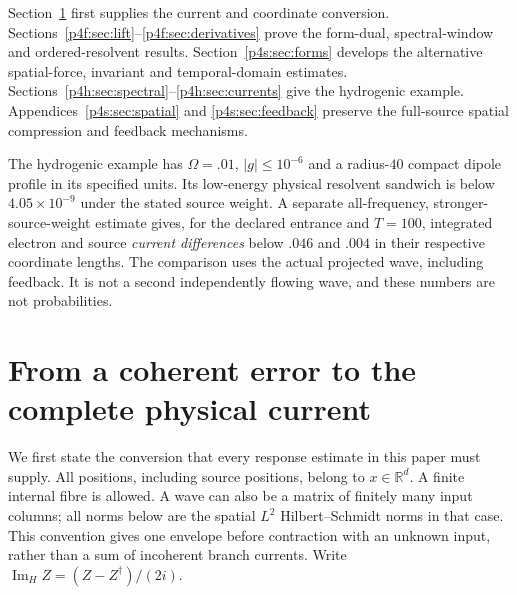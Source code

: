 \documentclass[11pt]{article}
\numberwithin{equation}{section}
\theoremstyle{definition}
\theoremstyle{remark}
\begin{document}
Section~\ref{p4s:sec:current} first supplies the current and coordinate
conversion. Sections~\ref{p4f:sec:lift}--\ref{p4f:sec:derivatives}
prove the form-dual, spectral-window and ordered-resolvent results.
Section~\ref{p4s:sec:forms} develops the alternative spatial-force,
invariant and temporal-domain estimates.
Sections~\ref{p4h:sec:spectral}--\ref{p4h:sec:currents} give the
hydrogenic example. Appendices~\ref{p4s:sec:spatial} and
\ref{p4s:sec:feedback} preserve the full-source spatial compression
and feedback mechanisms.

The hydrogenic example has
$\Omega=.01$, $|g|\leq10^{-6}$ and a radius-$40$ compact dipole
profile in its specified units. Its low-energy physical resolvent
sandwich is below $4.05\times10^{-9}$ under the stated source weight.
A separate all-frequency, stronger-source-weight estimate gives, for
the declared entrance and $T=100$, integrated electron and source
\emph{current differences} below $.046$ and $.004$ in their respective
coordinate lengths. The comparison uses the actual projected wave,
including feedback. It is not a second independently flowing wave,
and these numbers are not probabilities.

\section{From a coherent error to the complete physical current}
\label{p4s:sec:current}

We first state the conversion that every response estimate in this paper
must supply. All positions, including source positions, belong to
$x\in\mathbb R^d$. A finite internal fibre is allowed. A wave can also be a
matrix of finitely many input columns; all norms below are the spatial
$L^2$ Hilbert--Schmidt norms in that case. This convention gives one
envelope before contraction with an unknown input, rather than a sum of
incoherent branch currents. Write
$\operatorname{Im}_{H} Z=(Z-Z^\dagger)/(2i)$.
\end{document}
